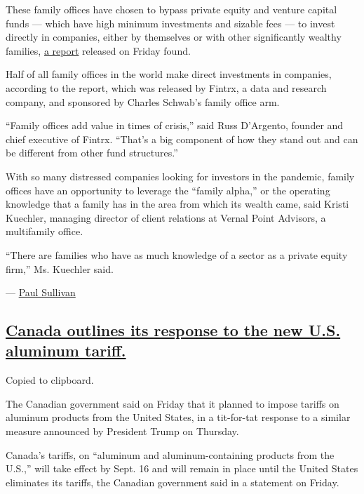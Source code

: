 These family offices have chosen to bypass private equity and venture
capital funds --- which have high minimum investments and sizable fees
--- to invest directly in companies, either by themselves or with other
significantly wealthy families,
\href{https://www.fintrx.com/fintrx-charles-schwab-2020-family-office-report}{a
report} released on Friday found.

Half of all family offices in the world make direct investments in
companies, according to the report, which was released by Fintrx, a data
and research company, and sponsored by Charles Schwab's family office
arm.

``Family offices add value in times of crisis,'' said Russ D'Argento,
founder and chief executive of Fintrx. ``That's a big component of how
they stand out and can be different from other fund structures.''

With so many distressed companies looking for investors in the pandemic,
family offices have an opportunity to leverage the ``family alpha,'' or
the operating knowledge that a family has in the area from which its
wealth came, said Kristi Kuechler, managing director of client relations
at Vernal Point Advisors, a multifamily office.

``There are families who have as much knowledge of a sector as a private
equity firm,'' Ms. Kuechler said.

--- \href{https://www.nytimes.com/by/paul-sullivan}{Paul Sullivan}

\hypertarget{canada-outlines-its-response-to-the-new-us-aluminum-tariff}{%
\subsection{\texorpdfstring{\protect\hyperlink{canada-outlines-its-response-to-the-new-us-aluminum-tariff}{Canada
outlines its response to the new U.S. aluminum
tariff.}}{Canada outlines its response to the new U.S. aluminum tariff.}}\label{canada-outlines-its-response-to-the-new-us-aluminum-tariff}}

Copied to clipboard.

The Canadian government said on Friday that it planned to impose tariffs
on aluminum products from the United States, in a tit-for-tat response
to a similar measure announced by President Trump on Thursday.

Canada's tariffs, on ``aluminum and aluminum-containing products from
the U.S.,'' will take effect by Sept. 16 and will remain in place until
the United States eliminates its tariffs, the Canadian government said
in a statement on Friday.

